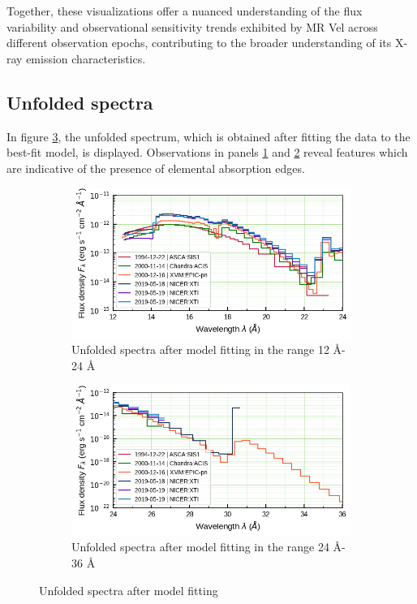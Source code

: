     Together, these visualizations offer a nuanced understanding of the flux variability and observational sensitivity trends exhibited by MR Vel across different observation epochs, contributing to the broader understanding of its X-ray emission characteristics.
    
    \subsection{Unfolded spectra}
    In figure \ref{fig:all-uf}, the unfolded spectrum, which is obtained after fitting the data to the best-fit model, is displayed. Observations in panels \ref{fig:all-uf:12-24} and \ref{fig:all-uf:24-36} reveal features which are indicative of the presence of elemental absorption edges.
    
    \begin{figure}[!bht]
        \centering
        \begin{subfigure}[b]{0.45\textwidth}
            \includegraphics[width=\textwidth]{figures/eufspec/mr-vel-uf_all-obs_12-24.png}
            \caption{Unfolded spectra after model fitting in the range 12 \AA - 24 \AA}
            \label{fig:all-uf:12-24}
        \end{subfigure}
        \hfill
        \begin{subfigure}[b]{0.45\textwidth}
            \includegraphics[width=\textwidth]{figures/eufspec/mr-vel-uf_all-obs_24-36.png}
            \caption{Unfolded spectra after model fitting in the range 24 \AA - 36 \AA}
            \label{fig:all-uf:24-36}
        \end{subfigure}
        \caption{Unfolded spectra after model fitting}
        \label{fig:all-uf}
    \end{figure}

